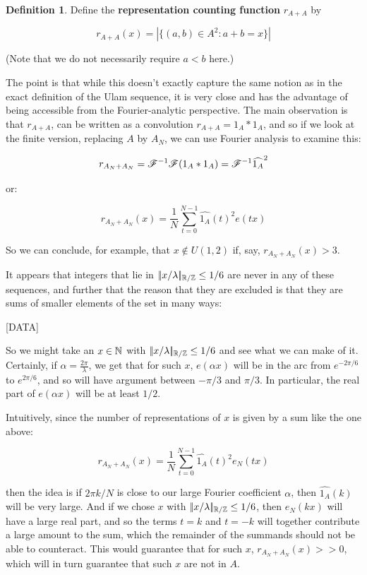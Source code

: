 \documentclass{article}
\theoremstyle{definition}
\newtheorem{definition}{Definition}
\theoremstyle{remark}
\numberwithin{equation}{section}
\begin{document}
\begin{definition}Define the \textbf{representation counting function}
  $r_{A+A}$ by 

  \[r_{A+A}(x) = \left|\{(a,b) \in A^2 : a+b = x\}\right|\]
  

  (Note that we do not necessarily require $a < b$ here.)
\end{definition} 

The point is that while this doesn't exactly capture the same notion
as in the exact definition of the Ulam sequence, it is very close and
has the advantage of being accessible from the Fourier-analytic
perspective.  The main observation is that $r_{A+A}$, can be written
as a convolution $r_{A+A} = 1_A \ast 1_A$, and so if we look at the
finite version, replacing $A$ by $A_N$, we can use Fourier analysis to
examine this:

\[r_{A_N+A_N} = \mathscr{F}^{-1}\mathscr{F} (1_A \ast 1_A) =
\mathscr{F}^{-1} \widehat{1_A}^2\]

or:

\[r_{A_N+A_N}(x) = \frac 1N \sum_{t=0}^{N-1} \widehat{1_A}(t)^2
  e(tx)\]

So we can conclude, for example, that $x \notin U(1,2)$ if, say,
$r_{A_{N}+A_{N}}(x) > 3$.  

It appears that integers that lie in $|\!|x/\lambda|\!|_{\mathbb{R}/\mathbb{Z}} \leq 1/6$ are
never in any of these sequences, and further that the reason that they
are excluded is that they are sums of smaller elements of the set in
many ways: {\color{red}

[DATA]

}

So we might take an $x \in \mathbb{N}$ with $|\!|x/\lambda|\!|_{\mathbb{R}/\mathbb{Z}} \leq 1/6$ and
see what we can make of it.  Certainly, if
$\alpha = \frac{2\pi}{\lambda}$, we get that for such $x$,
$e(\alpha x)$ will be in the arc from $e^{-2\pi/6}$ to $e^{2\pi/6}$,
and so will have argument between $-\pi/3$ and $\pi/3$.  In
particular, the real part of $e(\alpha x)$ will be at least $1/2$.

Intuitively, since the number of representations of $x$ is given by a
sum like the one above:

\[r_{A_N+A_N}(x) = \frac 1N \sum_{t=0}^{N-1} \widehat{1_A}(t)^2
  e_N(tx)\]

then the idea is if $2\pi k/N$ is close to our large Fourier
coefficient $\alpha$, then $\widehat{1_A}(k)$ will be very large.  And
if we chose $x$ with $|\!|x/\lambda|\!|_{\mathbb{R}/\mathbb{Z}} \leq 1/6$, then $e_N(kx)$
will have a large real part, and so the terms $t = k$ and $t = -k$
will together contribute a large amount to the sum, which the
remainder of the summands should not be able to counteract.  This
would guarantee that for such $x$, $r_{A_N+A_N}(x) >> 0$, which will
in turn guarantee that such $x$ are not in $A$.
\end{document}
